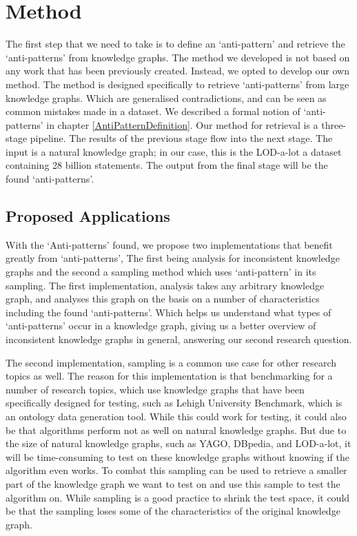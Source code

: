 \documentclass[11pt,letterpaper ,oneside ]{book}
\begin{document}
	\section{Method}
	The first step that we need to take is to define an `anti-pattern' and retrieve the `anti-patterns' from knowledge graphs. The method we developed is not based on any work that has been previously created. Instead, we opted to develop our own method. The method is designed specifically to retrieve `anti-patterns' from large knowledge graphs. Which are generalised contradictions, and can be seen as common mistakes made in a dataset. We described a formal notion of `anti-patterns' in chapter \ref{AntiPatternDefinition}. Our method for retrieval is a three-stage pipeline. The results of the previous stage flow into the next stage. The input is a natural knowledge graph; in our case, this is the LOD-a-lot\cite{JavierD:2017} a dataset containing 28 billion statements. The output from the final stage will be the found `anti-patterns'. 
	
	\subsection{Proposed Applications}
	With the `Anti-patterns' found, we propose two implementations that benefit greatly from `anti-patterns', The first being analysis for inconsistent knowledge graphs and the second a sampling method which uses `anti-pattern' in its sampling. The first implementation, analysis takes any arbitrary knowledge graph, and analyses this graph on the basis on a number of characteristics including the found `anti-patterns'. Which helps us understand what types of `anti-patterns' occur in a knowledge graph, giving us a better overview of inconsistent knowledge graphs in general, answering our second research question.
	
	The second implementation, sampling is a common use case for other research topics as well. The reason for this implementation is that benchmarking for a number of research topics, which use knowledge graphs that have been specifically designed for testing, such as Lehigh University Benchmark, which is an ontology data generation tool. While this could work for testing, it could also be that algorithms perform not as well on natural knowledge graphs. But due to the size of natural knowledge graphs, such as YAGO, DBpedia, and LOD-a-lot, it will be time-consuming to test on these knowledge graphs without knowing if the algorithm even works. To combat this sampling can be used to retrieve a smaller part of the knowledge graph we want to test on and use this sample to test the algorithm on. While sampling is a good practice to shrink the test space, it could be that the sampling loses some of the characteristics of the original knowledge graph. 
	
\end{document}

